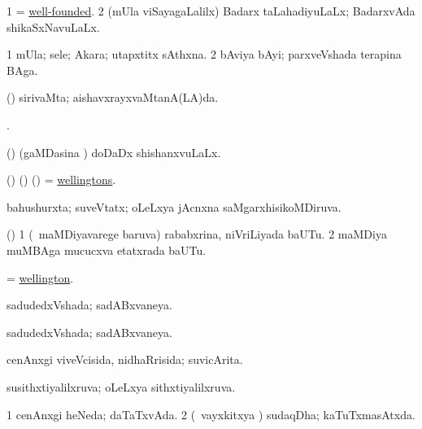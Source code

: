\bentry
{} 
\gl{\gu}
\expl{}
\bmng
\bnum
\num{1} = \hyperlink{well-founded}{well-founded}. 
\num{2} (mUla viSayagaLalilx) Badarx taLahadiyuLaLx; BadarxvAda shikaSxNavuLaLx. 
\enum
\emng
\eentry

\bentry
{} 
\gl{\nA}
\expl{}
\bmng
\bnum
\num{1} mUla; sele; Akara; utapxtitx sAthxna. 
\num{2} bAviya bAyi; parxveVshada terapina BAga. 
\enum
\emng
\eentry

\bentry
{} 
\gl{\gu}
\expl{}
\bmng
(\AmA) sirivaMta; aishavxrayxvaMtanA(LA)da. 
\emng
\eentry

\bentry
{} 
\bmng
{}  . 
\emng
\eentry

\bentry
{} 
\gl{\gu}
\expl{}
\bmng
(\AmA) (gaMDasina \vi) doDaDx shishanxvuLaLx. 
\emng
\eentry

\bentry
{} 
\gl{\nA}
\expl{}
\bmng
(\bava) (\birx) (\AmA) = \hyperlink{wellington}{wellingtons}. 
\emng
\eentry

\bentry
{} 
\gl{\gu}
\expl{}
\bmng
bahushurxta; suveVtatx; oLeLxya jAcnxna saMgarxhisikoMDiruva. 
\emng
\eentry

\bentry
{} 
\gl{\nA}
\expl{}
\bmng
(\birx) 
\bnum
\num{1} (\sA\ maMDiyavarege baruva) rababxrina, niVriLiyada baUTu. 
\num{2} maMDiya muMBAga mucucxva etatxrada baUTu. 
\enum
\emng
\eentry

\bentry
{} 
\gl{\nA}
\expl{}
\bmng
= \hyperlink{wellington}{wellington}. 
\emng
\eentry

\bentry
{} 
\gl{\gu}
\expl{}
\bmng
sadudedxVshada; sadABxvaneya. 
\emng
\eentry

\bentry
{} 
\gl{\gu}
\expl{}
\bmng
sadudedxVshada; sadABxvaneya. 
\emng
\eentry

\bentry
{} 
\gl{\gu}
\expl{}
\bmng
cenAnxgi viveVcisida, nidhaRrisida; suvicArita. 
\emng
\eentry

\bentry
{} 
\gl{\gu}
\expl{}
\bmng
susithxtiyalilxruva; oLeLxya sithxtiyalilxruva. 
\emng
\eentry

\bentry
{} 
\gl{\gu}
\expl{}
\bmng
\bnum
\num{1} cenAnxgi heNeda; daTaTxvAda. 
\num{2} (\kanmu\ vayxkitxya \vi) sudaqDha; kaTuTxmasAtxda. 
\enum
\emng
\eentry

